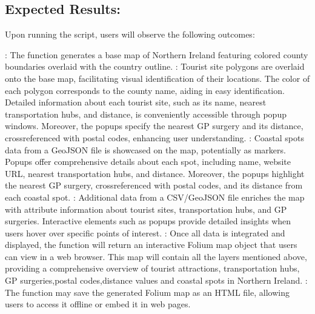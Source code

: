\documentclass[letterpaper,10pt,english]{sphinxmanual}
\begin{document}
\subsection{Expected Results:}
\label{\detokenize{egm722_serenee/NI_Tourist_Map_doc:expected-results}}
\sphinxAtStartPar
Upon running the script, users will observe the following outcomes:

\sphinxAtStartPar
{}: The function generates a base map of Northern Ireland featuring colored county boundaries overlaid with the country outline.
: Tourist site polygons are overlaid onto the base map, facilitating visual identification of their locations. The color of each polygon corresponds to the county name, aiding in easy identification. Detailed information about each tourist site, such as its name, nearest transportation hubs, and distance, is conveniently accessible through pop\sphinxhyphen{}up windows. Moreover, the pop\sphinxhyphen{}ups specify the nearest GP surgery and its distance, cross\sphinxhyphen{}referenced with postal codes, enhancing user understanding.
: Coastal spots data from a GeoJSON file is showcased on the map, potentially as markers. Pop\sphinxhyphen{}ups offer comprehensive details about each spot, including name, website URL, nearest transportation hubs, and distance. Moreover, the pop\sphinxhyphen{}ups highlight the nearest GP surgery, cross\sphinxhyphen{}referenced with postal codes, and its distance from each coastal spot.
: Additional data from a CSV/GeoJSON file enriches the map with attribute information about tourist sites, transportation hubs, and GP surgeries. Interactive elements such as pop\sphinxhyphen{}ups provide detailed insights when users hover over specific points of interest.
: Once all data is integrated and displayed, the function will return an interactive Folium map object that users can view in a web browser. This map will contain all the layers mentioned above, providing a comprehensive overview of tourist attractions, transportation hubs, GP surgeries,postal codes,distance values and coastal spots in Northern Ireland.
: The function may save the generated Folium map as an HTML file, allowing users to access it offline or embed it in web pages.
\end{document}
